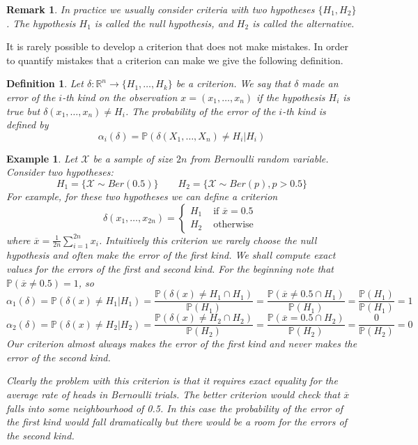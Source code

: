 \documentclass[12pt]{article}
\newtheorem{remark}[theorem]{Remark}
\newtheorem{definition}[theorem]{Definition}
\newtheorem{example}[theorem]{Example}
\begin{document}
\begin{remark} In practice we usually consider criteria with two hypotheses $\{H_1, H_2\}$. The hypothesis $H_1$ is called the null hypothesis, and $H_2$ is called the alternative. 
\end{remark}

It is rarely possible to develop a criterion that does not make mistakes. In order to quantify mistakes that a criterion can make we give the following definition.

\begin{definition} Let $\delta:\mathbb{R}^n\to\{H_1,\ldots,H_k\}$ be a criterion. We say that $\delta$ made an error of the $i$-th kind on the observation $x=(x_1,\ldots,x_n)$ if the hypothesis $H_i$ is true but $\delta(x_1,\ldots,x_n)\neq H_i$. The probability of the error of the $i$-th kind is defined by
$$
\alpha_i(\delta)=\mathbb{P}(\delta(X_1,\ldots,X_n)\neq H_i | H_i)
$$
\end{definition}

\begin{example} Let $\mathscr{X}$ be a sample of size $2n$ from Bernoulli random variable. Consider two hypotheses: 
$$
H_1=\{\mathscr{X}\sim Ber(0.5)\}
\quad\quad
H_2=\{\mathscr{X}\sim Ber(p), p>0.5\}
$$
For example, for these two hypotheses we can define a criterion
$$
\delta(x_1,\ldots,x_{2n})
=\begin{cases}
H_1 & \mbox{ if } \overline{x}=0.5\\
H_2 & \mbox{ otherwise } 
\end{cases}
$$
where $\overline{x}=\frac{1}{2n}\sum_{i=1}^{2n} x_i$. Intuitively this criterion we rarely choose the null hypothesis and often make the error of the first kind. We shall compute exact values for the errors of the first and second kind. For the beginning note that $\mathbb{P}(\overline{x}\neq 0.5)=1$, so
$$
\alpha_1(\delta)
=\mathbb{P}(\delta(x)\neq H_1|H_1)
=\frac{\mathbb{P}(\delta(x)\neq H_1 \cap H_1)}{\mathbb{P}(H_1)}
=\frac{\mathbb{P}(\overline{x}\neq 0.5 \cap H_1)}{\mathbb{P}(H_1)}
=\frac{\mathbb{P}(H_1)}{\mathbb{P}(H_1)}
=1
$$
$$
\alpha_2(\delta)
=\mathbb{P}(\delta(x)\neq H_2|H_2)
=\frac{\mathbb{P}(\delta(x)\neq H_2 \cap H_2)}{\mathbb{P}(H_2)}
=\frac{\mathbb{P}(\overline{x}= 0.5 \cap H_2)}{\mathbb{P}(H_2)}
=\frac{0}{\mathbb{P}(H_2)}
=0
$$
Our criterion almost always makes the error of the first kind and never makes the error of the second kind.

Clearly the problem with this criterion is that it requires exact equality for the average rate of heads in Bernoulli trials. The better criterion would check that $\overline{x}$ falls into some neighbourhood of 0.5. In this case the probability of the error of the first kind would fall dramatically but there would be a room for the errors of the second kind. 
\end{example}
\end{document}
